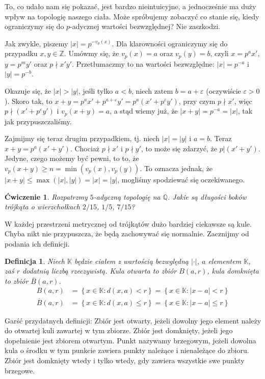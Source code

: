 \documentclass[a4paper,fleqn,9pt]{extarticle}
\newtheorem{prb}[prbh]{\'Cwiczenie}
\newtheorem{dff}{Definicja}
\begin{document}
To, co udało nam się pokazać, jest bardzo nieintuicyjne, a jednocześnie ma duży wpływ na topologię naszego ciała. Może spróbujemy zobaczyć co stanie się, kiedy ograniczymy się do $p$-adycznej wartości bezwzględnej? Nie zaszkodzi.

Jak zwykle, piszemy $|x| = p^{-v_p(x)}$. Dla klarowności ograniczymy się do przypadku $x,y\in\mathbb Z$. Umówmy się, że $v_p(x) = a$ oraz $v_p(y)= b$, czyli $x = p^a x'$, $y = p^m y'$ oraz $p\nmid x'y'$. Przetłumaczmy to na wartości bezwzględne: $|x| = p^{-a}$ i $|y| = p^{-b}$. 

Okazuje się, że $|x| > |y|$, jeśli tylko $a < b$, niech zatem $b = a + \varepsilon$ (oczywiście $\varepsilon > 0$). Skoro tak, to $x +y = p^ax' + p^{a+\varepsilon} y' = p ^a\left(x' + p^\varepsilon y'\right)$,
przy czym $p\nmid x'$, więc $p \nmid (x' + p^\varepsilon y')$ i $v_p(x+y) = a$, a stąd wiemy już, że $|x+y | = p^{-a} = |x|$, tak jak przypuszczaliśmy.

Zajmijmy się teraz drugim przypadkiem, tj. niech $|x| = |y|$ i $a = b$. Teraz $x+y = p^a(x'+y')$. Chociaż $p\nmid x'$ i $p \nmid y'$, to może się zdarzyć, że $p | (x'+y')$. Jedyne, czego możemy być pewni, to to, że $v_p(x+y) \ge n = \min(v_p(x), v_p(y))$. To oznacza jednak, że $|x+y| \le \max(|x|, |y|) = |x| = |y|$, mogliśmy spodziewać się oczekiwanego.

\begin{prb}Rozpatrzmy $5$-adyczną topologię na $\mathbb Q$. Jakie są długości boków trójkąta o wierzchołkach $2/15$, $1/5$, $7/15$?\end{prb}

W każdej przestrzeni metrycznej od trójkątów dużo bardziej ciekawsze są kule. Chyba nikt nie przypuszcza, że będą zachowywać się normalnie. Zacznijmy od podania ich definicji.

\begin{dff}Niech $\mathbb K$ będzie ciałem z wartością bezwględną $|\cdot|$, $a$ elementem $\mathbb K$, zaś $r$ dodatnią liczbą rzeczywistą. Kula otwarta to zbiór $B(a,r)$, kula domknięta to zbiór $\overline{B}(a,r)$.
\begin{align*}
B(a,r) & = \left\{x\in\mathbb K: d(x,a) < r \right\} = \left\{x\in\mathbb K: |x-a| < r \right\} \\
\overline{B}(a,r) & = \left\{x\in\mathbb K: d(x,a) \le r \right\} = \left\{x\in\mathbb K: |x-a| \le r \right\}
\end{align*}
\end{dff}

Garść przydatnych definicji: {Zbiór jest otwarty, jeżeli dowolny jego element należy do otwartej kuli zawartej w tym zbiorze. Zbiór jest domknięty, jeżeli jego dopełnienie jest zbiorem otwartym. Punkt nazywamy brzegowym, jeżeli dowolna kula o środku w tym punkcie zawiera punkty należące i nienależące do zbioru. Zbiór jest domknięty wtedy i tylko wtedy, gdy zawiera wszystkie swe punkty brzegowe.}
\end{document}
